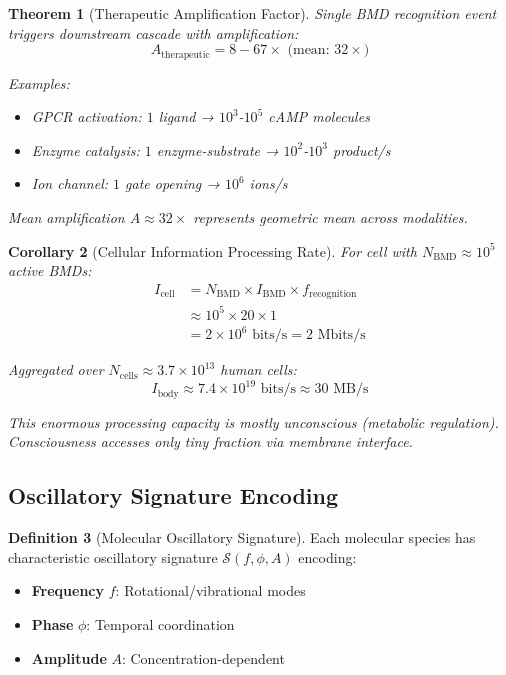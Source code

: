 \documentclass[11pt,a4paper]{article}
\newtheorem{theorem}{Theorem}[section]
\newtheorem{corollary}[theorem]{Corollary}
\theoremstyle{definition}
\newtheorem{definition}[theorem]{Definition}
\theoremstyle{remark}
\begin{document}
\begin{theorem}[Therapeutic Amplification Factor]
Single BMD recognition event triggers downstream cascade with amplification:
\begin{equation}
A_{\text{therapeutic}} = 8 - 67 \times \text{ (mean: } 32\times\text{)}
\end{equation}

Examples:
\begin{itemize}
\item GPCR activation: $1$ ligand → $10^3$-$10^5$ cAMP molecules
\item Enzyme catalysis: $1$ enzyme-substrate → $10^2$-$10^3$ product/s
\item Ion channel: $1$ gate opening → $10^6$ ions/s
\end{itemize}

Mean amplification $A \approx 32\times$ represents geometric mean across modalities.
\end{theorem}

\begin{corollary}[Cellular Information Processing Rate]
For cell with $N_{\text{BMD}} \approx 10^5$ active BMDs:
\begin{align}
I_{\text{cell}} &= N_{\text{BMD}} \times I_{\text{BMD}} \times f_{\text{recognition}} \\
&\approx 10^5 \times 20 \times 1 \\
&= 2 \times 10^6 \text{ bits/s} = 2 \text{ Mbits/s}
\end{align}

Aggregated over $N_{\text{cells}} \approx 3.7 \times 10^{13}$ human cells:
\begin{equation}
I_{\text{body}} \approx 7.4 \times 10^{19} \text{ bits/s} \approx 30 \text{ MB/s}
\end{equation}

This enormous processing capacity is mostly unconscious (metabolic regulation). Consciousness accesses only tiny fraction via membrane interface.
\end{corollary}

\subsection{Oscillatory Signature Encoding}

\begin{definition}[Molecular Oscillatory Signature]
Each molecular species has characteristic oscillatory signature $\mathcal{S}(f, \phi, A)$ encoding:
\begin{itemize}
\item \textbf{Frequency} $f$: Rotational/vibrational modes
\item \textbf{Phase} $\phi$: Temporal coordination
\item \textbf{Amplitude} $A$: Concentration-dependent
\end{itemize}
\end{definition}
\end{document}
